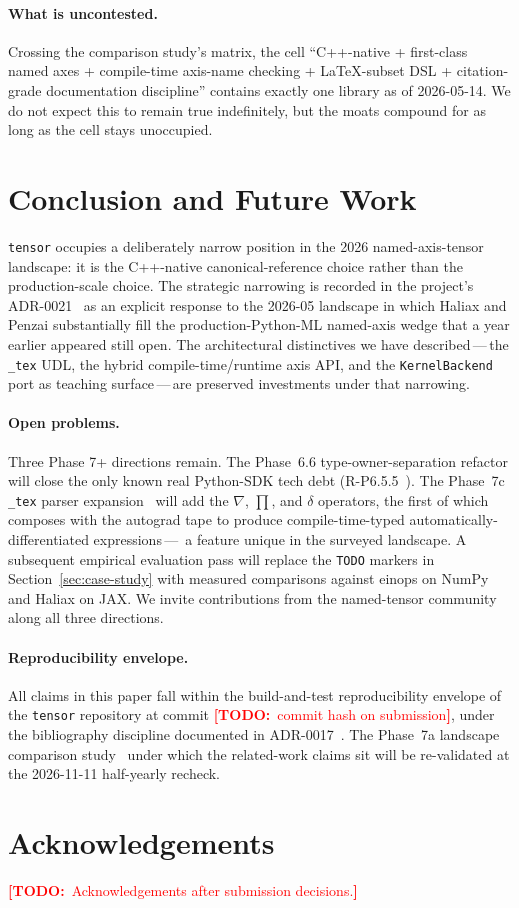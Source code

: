 \documentclass[11pt,a4paper]{article}
\newcommand{\todo}[1]{\textcolor{red}{\textbf{[TODO:}\ #1\textbf{]}}}
\begin{document}
\paragraph{What is uncontested.} Crossing the comparison study's
matrix, the cell ``C++-native + first-class named axes +
compile-time axis-name checking + \LaTeX-subset DSL +
citation-grade documentation discipline'' contains exactly one
library as of 2026-05-14. We do not expect this to remain true
indefinitely, but the moats compound for as long as the cell
stays unoccupied.

\section{Conclusion and Future Work}
\label{sec:conclusion}

\texttt{tensor} occupies a deliberately narrow position in the
2026 named-axis-tensor landscape: it is the C++-native
canonical-reference choice rather than the production-scale
choice. The strategic narrowing is recorded in the project's
ADR-0021~\cite{tensorADR0021} as an explicit response to the
2026-05 landscape in which Haliax and Penzai substantially fill
the production-Python-ML named-axis wedge that a year earlier
appeared still open. The architectural distinctives we have
described\,---\,the \texttt{\_tex} UDL, the hybrid
compile-time/runtime axis API, and the
\texttt{KernelBackend} port as teaching surface\,---\,are
preserved investments under that narrowing.

\paragraph{Open problems.} Three Phase 7+ directions remain. The
Phase~6.6 type-owner-separation refactor will close the only
known real Python-SDK tech debt
(R-P6.5.5~\cite{tensorADR0020}). The Phase~7c
\texttt{\_tex} parser
expansion~\cite{tensorRoadmap2026} will add the
$\nabla$, $\prod$, and $\delta$ operators, the first of which
composes with the autograd tape to produce
compile-time-typed automatically-differentiated expressions\,---
\,a feature unique in the surveyed landscape. A subsequent
empirical evaluation pass will replace the \texttt{TODO} markers
in Section~\ref{sec:case-study} with measured comparisons against
einops on NumPy and Haliax on JAX. We invite contributions
from the named-tensor community along all three directions.

\paragraph{Reproducibility envelope.} All claims in this paper
fall within the build-and-test
reproducibility envelope of the
\texttt{tensor} repository at commit
\todo{commit hash on submission}, under the bibliography
discipline documented in
ADR-0017~\cite{tensorADR0017}. The Phase~7a
landscape comparison study~\cite{tensorComparison2026}
under which the related-work claims sit will be
re-validated at the 2026-11-11 half-yearly recheck.

\section*{Acknowledgements}

\todo{Acknowledgements after submission decisions.}



\end{document}
